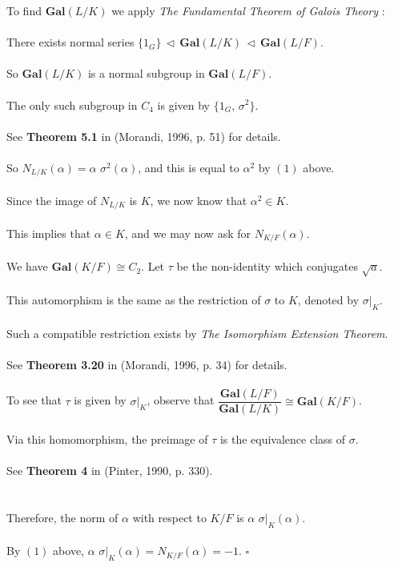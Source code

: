 \documentclass{article}
\begin{document}
To find $\textbf{Gal}(L/K)$ we apply \emph{The Fundamental Theorem of Galois Theory} : \\\\
\indent There exists normal series $\{1_G\} \, \triangleleft \, \textbf{Gal}(L/K) \, \triangleleft \, \textbf{Gal}(L/F)$. \\\\
\indent So $\textbf{Gal}(L/K)$ is a normal subgroup in $\textbf{Gal}(L/F)$. \\\\
\indent The only such subgroup in $C_4$ is given by $\{1_G, \, \sigma^2\}$. \\\\
\indent See \textbf{Theorem 5.1} in (Morandi, 1996, p. 51) for details. \\\\
So $N_{L/K}(\alpha) = \alpha \,\, \sigma^2(\alpha)$, and this is equal to $\alpha^2$ by $(1)$ above. \\\\
Since the image of $N_{L/K}$ is $K$, we now know that $\alpha^2 \in K$. \\\\
This implies that $\alpha \in K$, and we may now ask for $N_{K/F}(\alpha)$. \\\\
We have $\textbf{Gal}(K/F) \cong C_2$. Let $\tau$ be the non-identity which conjugates $\sqrt{a}$. \\\\
This automorphism is the same as the restriction of $\sigma$ to $K$, denoted by $\sigma|_K$. \\\\
\indent Such a compatible restriction exists by \emph{The Isomorphism Extension Theorem}. \\\\
\indent See \textbf{Theorem 3.20} in (Morandi, 1996, p. 34) for details. \\\\
\indent To see that $\tau$ is given by $\sigma|_K$, observe that $\dfrac{\textbf{Gal}(L/F)}{\textbf{Gal}(L/K)} \cong \textbf{Gal}(K/F)$. \\\\
\indent Via this homomorphism, the preimage of $\tau$ is the equivalence class of $\sigma$. \\\\
\indent  See \textbf{Theorem 4} in (Pinter, 1990, p. 330). \\\\\\
Therefore, the norm of $\alpha$ with respect to $K/F$ is $\alpha \,\, \sigma|_K(\alpha)$. \\\\
By $(1)$ above, $\alpha \,\, \sigma|_K(\alpha) = N_{K/F}(\alpha) = -1$. $\square$ \\\\\\
\end{document}
